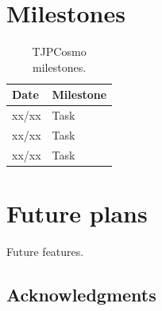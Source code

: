 \documentclass[\docopts]{\docclass}
\begin{document}

\section{Milestones}
\label{sec:mile}

\begin{table}[h!]
    \caption{TJPCosmo milestones.}
    \label{tab:mile}
    \begin{tabular}{| l| l |}
      \hline
      \textbf{Date} & \textbf{Milestone}\\
      \hline
      xx/xx & Task\\
      xx/xx & Task\\
      xx/xx & Task\\
      \hline
    \end{tabular}
\end{table}



\section{Future plans}
\label{sec:future}

Future features.

\subsection*{Acknowledgments}











\end{document}
